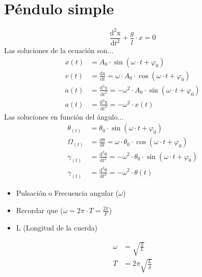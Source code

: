 
\section{Péndulo simple}
    \begin{equation}
        \frac{\mathrm{d^2x} }{\mathrm{d} t^2} + \frac{g}{l} \cdot x = 0
    \end{equation}
    Las soluciones de la ecuación son...
    \begin{equation*}
    \begin{split}
        x(t) &= A_0 \cdot \sin(\omega\cdot t + \varphi_0)\\
        v(t) &= \frac{\mathrm{dx} }{\mathrm{d} t} = \omega \cdot A_0 \cdot \cos(\omega\cdot t + \varphi_0)\\
        a(t) &= \frac{\mathrm{d^2x} }{\mathrm{d} t^2} = - \omega^2 \cdot A_0 \cdot \sin(\omega\cdot t + \varphi_0)\\
        a(t) &= \frac{\mathrm{d^2x} }{\mathrm{d} t^2} = - \omega^2 \cdot x(t)    
    \end{split}
    \end{equation*}
    Las soluciones en función del ángulo...
    \begin{equation*}
    \begin{split}
        \theta_{(t)} &= \theta_0 \cdot \sin(\omega\cdot t + \varphi_0)\\
        \Omega_{(t)} &= \frac{\mathrm{d\theta} }{\mathrm{d} t} = \omega \cdot \theta_0 \cdot \cos(\omega\cdot t + \varphi_0)\\
        \gamma_{(t)} &= \frac{\mathrm{d^2\theta} }{\mathrm{d} t^2} = - \omega^2 \cdot \theta_0 \cdot \sin(\omega\cdot t + \varphi_0)\\
        \gamma_{(t)} &= \frac{\mathrm{d^2\theta} }{\mathrm{d} t^2} = - \omega^2 \cdot \theta(t)    
    \end{split}
    \end{equation*}

    \begin{itemize}
        \item Pulsación o Frecuencia angular ($\omega$)
        \item Recordar que ($\omega = 2\pi \cdot T = \frac{2\pi}{F}$)
        \item L (Longitud de la cuerda)
    \end{itemize}
    \begin{equation}
    \begin{split}
        \omega &= \sqrt{\frac{g}{L}}\\
        T &= 2\pi \sqrt{\frac{L}{g}}
    \end{split}    
    \end{equation}
    
